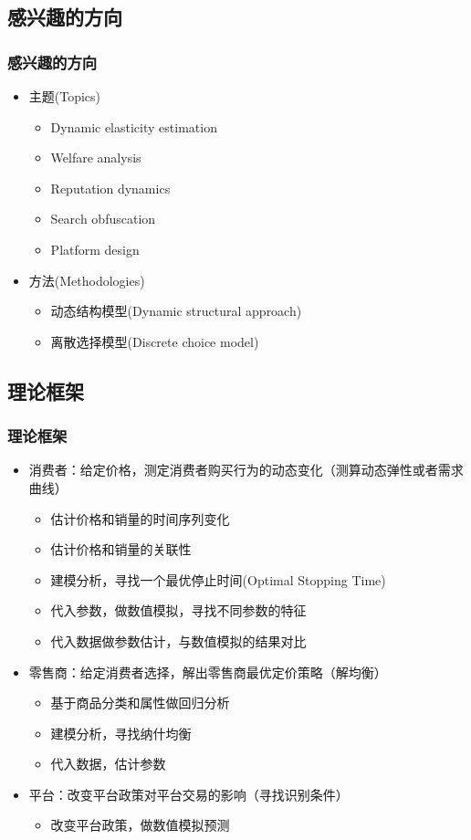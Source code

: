 \documentclass{beamer}
\begin{document}
\subsection{感兴趣的方向}
\begin{frame}
\frametitle{感兴趣的方向}
\begin{itemize}
\item 主题(Topics)
\begin{itemize}
  \item Dynamic elasticity estimation 
  \item Welfare analysis
  \item Reputation dynamics
  \item Search obfuscation
  \item Platform design
\end{itemize}
\item 方法(Methodologies)
\begin{itemize}
  \item 动态结构模型(Dynamic structural approach)
  \item 离散选择模型(Discrete choice model)
\end{itemize}
\end{itemize}
\end{frame}

\subsection{理论框架}
\begin{frame}[allowframebreaks]
\frametitle{理论框架}
\begin{itemize}
  \item 消费者：给定价格，测定消费者购买行为的动态变化（测算动态弹性或者需求曲线）
  \begin{itemize}
    \item 估计价格和销量的时间序列变化
    \item 估计价格和销量的关联性
    \item 建模分析，寻找一个最优停止时间(Optimal Stopping Time)
    \item 代入参数，做数值模拟，寻找不同参数的特征
    \item 代入数据做参数估计，与数值模拟的结果对比
  \end{itemize} 
  \framebreak
  \item 零售商：给定消费者选择，解出零售商最优定价策略（解均衡）
  \begin{itemize}
    \item 基于商品分类和属性做回归分析
    \item 建模分析，寻找纳什均衡
    \item 代入数据，估计参数
  \end{itemize}
  \item 平台：改变平台政策对平台交易的影响（寻找识别条件）
  \begin{itemize}
    \item 改变平台政策，做数值模拟预测
  \end{itemize}
\end{itemize}
\end{frame}
\end{document}
